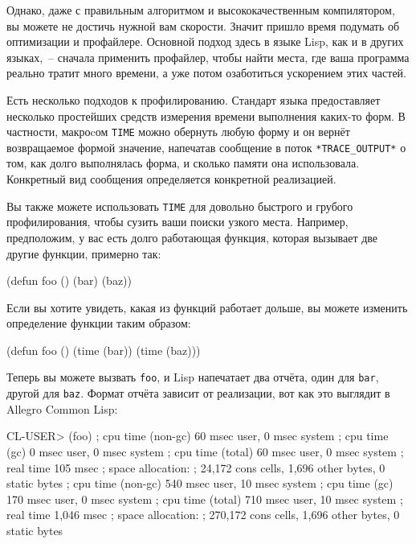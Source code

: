 Однако, даже с правильным алгоритмом и высококачественным компилятором, вы можете не
достичь нужной вам скорости. Значит пришло время подумать об оптимизации и
профайлере. Основной подход здесь в языке Lisp, как и в других языках,~-- сначала
применить профайлер, чтобы найти места, где ваша программа реально тратит много времени, а
уже потом озаботиться ускорением этих частей.

Есть несколько подходов к профилированию. Стандарт языка предоставляет несколько
простейших средств измерения времени выполнения каких-то форм. В частности, макроcом
\lstinline{TIME} можно обернуть любую форму и он вернёт возвращаемое формой значение, напечатав
сообщение в поток \lstinline!*TRACE_OUTPUT*! о том, как долго выполнялась форма, и сколько
памяти она использовала. Конкретный вид сообщения определяется конкретной реализацией.

Вы также можете использовать \lstinline{TIME} для довольно быстрого и грубого профилирования,
чтобы сузить ваши поиски узкого места. Например, предположим, у вас есть долго работающая
функция, которая вызывает две другие функции, примерно так:

\begin{myverb}
  (defun foo ()
    (bar)
    (baz))
\end{myverb}

Если вы хотите увидеть, какая из функций работает дольше, вы можете изменить определение функции таким образом:

\begin{myverb}
  (defun foo ()
    (time (bar))
    (time (baz)))
\end{myverb}

Теперь вы можете вызвать \lstinline{foo}, и Lisp напечатает два отчёта, один для \lstinline{bar},
другой для \lstinline{baz}. Формат отчёта зависит от реализации, вот как это выглядит в Allegro
Common Lisp:

\begin{myverb}
CL-USER> (foo)
; cpu time (non-gc) 60 msec user, 0 msec system
; cpu time (gc)     0 msec user, 0 msec system
; cpu time (total)  60 msec user, 0 msec system
; real time  105 msec
; space allocation:
;  24,172 cons cells, 1,696 other bytes, 0 static bytes
; cpu time (non-gc) 540 msec user, 10 msec system
; cpu time (gc)     170 msec user, 0 msec system
; cpu time (total)  710 msec user, 10 msec system
; real time  1,046 msec
; space allocation:
;  270,172 cons cells, 1,696 other bytes, 0 static bytes
\end{myverb}


